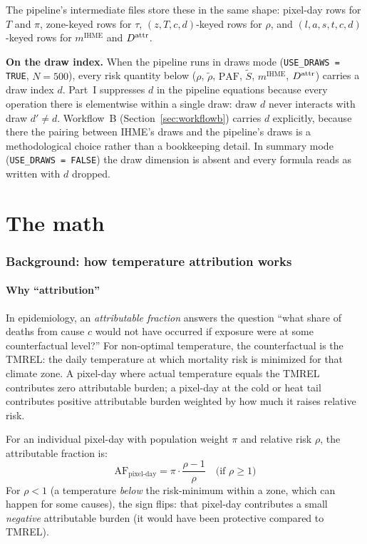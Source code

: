 \documentclass[11pt]{article}
\newcommand{\PAF}{\text{PAF}}
\newcommand{\mIHME}{m^{\text{IHME}}}
\begin{document}
The pipeline's intermediate files store these in the same shape:
pixel-day rows for $T$ and $\pi$, zone-keyed rows for $\tau$,
$(z, T, c, d)$-keyed rows for $\rho$, and $(l, a, s, t, c, d)$-keyed
rows for $\mIHME$ and $\mAttr$.

\textbf{On the draw index.} When the pipeline runs in draws mode
(\texttt{USE\_DRAWS = TRUE}, $N = 500$), every risk quantity below
($\rho$, $\tilde\rho$, $\PAF$, $\tilde S$, $\mIHME$, $\mAttr$) carries a
draw index $d$. Part~I suppresses $d$ in the pipeline equations because
every operation there is elementwise within a single draw: draw $d$ never
interacts with draw $d' \neq d$. Workflow~B (Section~\ref{sec:workflowb})
carries $d$ explicitly, because there the pairing between IHME's draws and
the pipeline's draws is a methodological choice rather than a
bookkeeping detail. In summary mode (\texttt{USE\_DRAWS = FALSE}) the draw
dimension is absent and every formula reads as written with $d$ dropped.

\part{The math}

\section{Background: how temperature attribution works}

\subsection{Why ``attribution''}

In epidemiology, an \emph{attributable fraction} answers the question
``what share of deaths from cause $c$ would not have occurred if exposure
were at some counterfactual level?'' For non-optimal temperature, the
counterfactual is the TMREL: the daily temperature at which mortality
risk is minimized for that climate zone. A pixel-day where actual
temperature equals the TMREL contributes zero attributable burden; a
pixel-day at the cold or heat tail contributes positive attributable
burden weighted by how much it raises relative risk.

For an individual pixel-day with population weight $\pi$ and relative
risk $\rho$, the attributable fraction is:
\begin{equation}
\text{AF}_{\text{pixel-day}} = \pi \cdot \frac{\rho - 1}{\rho}
\quad \text{(if } \rho \geq 1)
\label{eq:af-pixel}
\end{equation}
For $\rho < 1$ (a temperature \emph{below} the risk-minimum within a zone,
which can happen for some causes), the sign flips: that pixel-day
contributes a small \emph{negative} attributable burden (it would have
been protective compared to TMREL).
\end{document}
